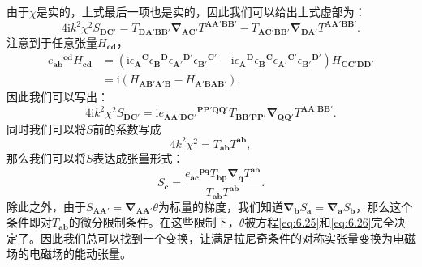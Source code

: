 由于$\chi $是实的，上式最后一项也是实的，因此我们可以给出上式虚部为：
\begin{equation*}
	4\mathrm{i} k^{2} \chi ^{2} S_{\boldsymbol{DC} '} =T_{\boldsymbol{DA} '\boldsymbol{BB} '}\boldsymbol{\nabla }_{\boldsymbol{AC} '} T^{\boldsymbol{AA} '\boldsymbol{BB} '} -T_{\boldsymbol{AC} '\boldsymbol{BB} '}\boldsymbol{\nabla }_{\boldsymbol{DA} '} T^{\boldsymbol{AA} '\boldsymbol{BB} '} .
\end{equation*}
注意到于任意张量$H_{\boldsymbol{cd}}$，
\begin{equation*}
	\begin{aligned}
		e{_{\boldsymbol{ab}}}^{\boldsymbol{cd}} H_{\boldsymbol{cd}} & =(\mathrm{i} \epsilon \boldsymbol{{_{A}}}^{\boldsymbol{C}} \epsilon \boldsymbol{{_{B}}}^{\boldsymbol{D}} \epsilon {_{\boldsymbol{A} '}}^{\boldsymbol{D} '} \epsilon {_{\boldsymbol{B} '}}^{\boldsymbol{C} '} -\mathrm{i} \epsilon {_{\boldsymbol{A}}}^{\boldsymbol{D}} \epsilon {_{\boldsymbol{B}}}^{\boldsymbol{C}} \epsilon \boldsymbol{{_{A'}}}^{\boldsymbol{C} '} \epsilon \boldsymbol{{_{B'}}}^{\boldsymbol{D} '} )H_{\boldsymbol{CC} '\boldsymbol{DD} '}\\
		& =\mathrm{i}( H_{\boldsymbol{AB} '\boldsymbol{A} '\boldsymbol{B}} -H_{\boldsymbol{A} '\boldsymbol{BAB} '}) ,
	\end{aligned}
\end{equation*}
因此我们可以写出：
\begin{equation*}
	4\mathrm{i} k^{2} \chi ^{2} S_{\boldsymbol{DC} '} =\mathrm{i} e{_{\boldsymbol{AA} '\boldsymbol{DC} '}}^{\boldsymbol{PP} '\boldsymbol{QQ} '} T_{\boldsymbol{BB} '\boldsymbol{PP} '}\boldsymbol{\nabla }_{\boldsymbol{QQ} '} T^{\boldsymbol{AA} '\boldsymbol{BB} '} .
\end{equation*}
同时我们可以将$S$前的系数写成
\begin{equation*}
	4k^{2} \chi ^{2} =T_{\boldsymbol{ab}} T^{\boldsymbol{ab}} ,
\end{equation*}
那么我们可以将$S$表达成张量形式：
\begin{equation}
	S_{\boldsymbol{c}} =\frac{e{_{\boldsymbol{ac}}}^{\boldsymbol{pq}} T_{\boldsymbol{bp}}\boldsymbol{\nabla }_{\boldsymbol{q}} T^{\boldsymbol{ab}}}{T_{\boldsymbol{ab}} T^{\boldsymbol{ab}}} .
	\label{eq:6.26}
\end{equation}
除此之外，由于$S_{\boldsymbol{AA} '} =\boldsymbol{\nabla }_{\boldsymbol{AA} '} \theta $为标量的梯度，我们知道$\boldsymbol{\nabla }_{\boldsymbol{b}} S_{\boldsymbol{a}} =\boldsymbol{\nabla }_{\boldsymbol{a}} S_{\boldsymbol{b}}$，那么这个条件即对$T_{\boldsymbol{ab}}$的微分限制条件。在这些限制下，$\theta $被方程\ref{eq:6.25}和\ref{eq:6.26}完全决定了。因此我们总可以找到一个变换，让满足拉尼奇条件的对称实张量变换为电磁场的电磁场的能动张量。


